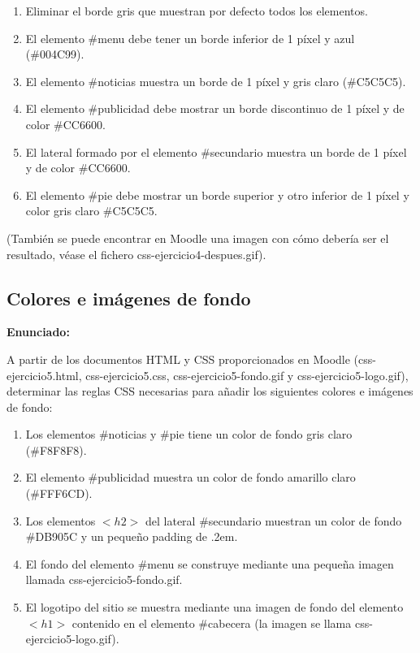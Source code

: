 \begin{enumerate}
  \item Eliminar el borde gris que muestran por defecto todos los elementos.
  \item El elemento \#menu debe tener un borde inferior de 1 píxel y azul (\#004C99).
  \item El elemento \#noticias muestra un borde de 1 píxel y gris claro (\#C5C5C5).
  \item El elemento \#publicidad debe mostrar un borde discontinuo de 1 píxel y de color \#CC6600.
  \item El lateral formado por el elemento \#secundario muestra un borde de 1 píxel y de color \#CC6600.
  \item El elemento \#pie debe mostrar un borde superior y otro inferior de 1 píxel y color gris claro \#C5C5C5.
\end{enumerate}

(También se puede encontrar en Moodle una imagen con cómo debería ser el resultado, 
véase el fichero css-ejercicio4-despues.gif).

\subsection{Colores e imágenes de fondo}
\label{subsec:colores}

\textbf{Enunciado:}

A partir de los documentos HTML y CSS proporcionados en Moodle (css-ejercicio5.html, css-ejercicio5.css, css-ejercicio5-fondo.gif y css-ejercicio5-logo.gif), determinar las reglas CSS necesarias para añadir los siguientes colores e imágenes de fondo:

\begin{enumerate}
  \item Los elementos \#noticias y \#pie tiene un color de fondo gris claro (\#F8F8F8).
  \item El elemento \#publicidad muestra un color de fondo amarillo claro (\#FFF6CD).
  \item Los elementos $<h2>$ del lateral \#secundario muestran un color de fondo \#DB905C y un pequeño padding de .2em.
  \item El fondo del elemento \#menu se construye mediante una pequeña imagen llamada css-ejercicio5-fondo.gif.
  \item El logotipo del sitio se muestra mediante una imagen de fondo del elemento $<h1>$ contenido en el elemento \#cabecera (la imagen se llama css-ejercicio5-logo.gif).
\end{enumerate}

